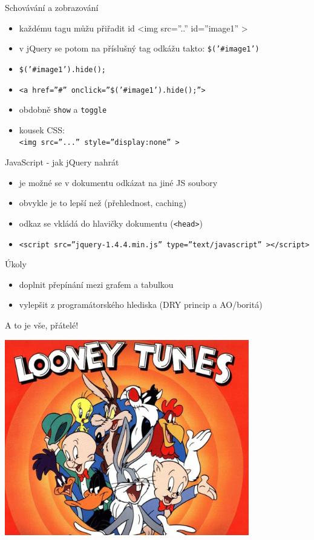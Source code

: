 \documentclass{beamer}
\begin{document}
\begin{frame}{Schovávání a zobrazování}
  \begin{itemize}
    \item každému tagu můžu přiřadit id <img src=''..'' id=''image1'' >
    \item v jQuery se potom na příslušný tag odkážu takto: \texttt{\$('\#image1')}
    \item \texttt{\$('\#image1').hide();}
    \item \texttt{<a href=''\#'' onclick=''\$('\#image1').hide();''>}
    \item obdobně \texttt{show} a \texttt{toggle}
    \item kousek CSS: \\ \texttt{<img src=''...'' style=''display:none'' >}
  \end{itemize}
\end{frame}

\begin{frame}{JavaScript - jak jQuery nahrát}
  \begin{itemize}
    \item je možné se v dokumentu odkázat na jiné JS soubory
    \item obvykle je to lepší než (přehlednost, caching)
    \item odkaz se vkládá do hlavičky dokumentu (\texttt{<head>})
    \item \texttt{<script src=''jquery-1.4.4.min.js'' type=''text/javascript'' ></script>}
  \end{itemize}
\end{frame}

\begin{frame}{Úkoly}
  \begin{itemize}
    \item doplnit přepínání mezi grafem a tabulkou
    \item vylepšit z programátorského hlediska (DRY princip a AO/boritá)
  \end{itemize}
\end{frame}

\begin{frame}{A to je vše, přátelé!}
  \begin{center}
    \includegraphics[width=0.8\textwidth]{looney_tunes}
  \end{center}
\end{frame}
\end{document}
